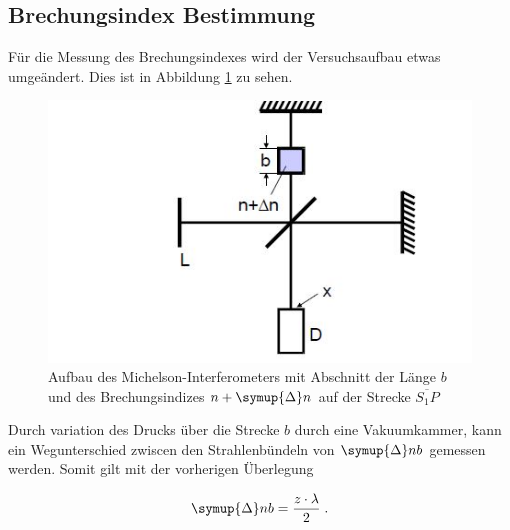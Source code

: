 \subsection{Brechungsindex Bestimmung}
Für die Messung des Brechungsindexes wird der Versuchsaufbau etwas umgeändert. Dies ist in Abbildung \ref{fig:2} zu sehen.

\begin{figure}
    \centering
    \includegraphics[scale = 0.7]{Picture/Pic2.JPG}
    \caption{Aufbau des Michelson-Interferometers mit Abschnitt der Länge $b$ und des
    Brechungsindizes $n + \symup{\Delta}n$ auf der Strecke $\overline{S_1 P}$}
    \label{fig:2}
  \end{figure}
\noindent
Durch variation des Drucks über die Strecke $b$ durch eine Vakuumkammer, kann ein Wegunterschied zwiscen den Strahlenbündeln von $\symup{\Delta}nb$ gemessen werden. Somit 
gilt mit der vorherigen Überlegung

\begin{equation*}
    \symup{\Delta}nb = \frac{z \cdot \lambda}{2} \; .
    \label{eqn:nb2}
  \end{equation*}


